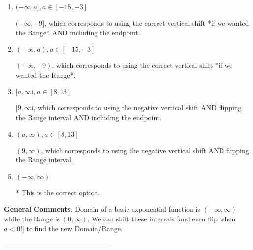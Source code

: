 \documentclass{article}[14pt]
\begin{document}
\begin{enumerate}[label=\Alph*.] 
\item $ (-\infty, a], a \in [-15, -3] $ 

 $(-\infty, -9]$, which corresponds to using the correct vertical shift *if we wanted the Range* AND including the endpoint. 
\item $ (-\infty, a), a \in [-15, -3] $ 

 $(-\infty, -9)$, which corresponds to using the correct vertical shift *if we wanted the Range*. 
\item $ [a, \infty), a \in [8, 13] $ 

 $[9, \infty)$, which corresponds to using the negative vertical shift AND flipping the Range interval AND including the endpoint. 
\item $ (a, \infty), a \in [8, 13] $ 

 $(9, \infty)$, which corresponds to using the negative vertical shift AND flipping the Range interval. 
\item $ (-\infty, \infty) $ 

 * This is the correct option. 
\end{enumerate} 
 
\textbf{General Comments}: Domain of a basic exponential function is $(-\infty, \infty)$ while the Range is $(0, \infty)$. We can shift these intervals [and even flip when $a<0$!] to find the new Domain/Range.

-----------------------------------------------
\end{document}
